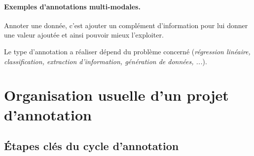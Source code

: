 			\paragraph{Exemples d'annotations multi-modales.}
		
		
		\begin{leftBarSummary}
			\begin{todolist}
				\item[\itemok] Annoter une donnée, c'est ajouter un complément d'information pour lui donner une valeur ajoutée et ainsi pouvoir mieux l'exploiter.
				\item[\itemok] Le type d'annotation a réaliser dépend du problème concerné (\textit{régression linéaire, classification, extraction d'information, génération de données, ...}).
			\end{todolist}
		\end{leftBarSummary}
	
	
    \section{Organisation usuelle d'un projet d'annotation}
	\label{section:2.2-ORGANISATION-ANNOTATION}
		
		
		\subsection{Étapes clés du cycle d'annotation}
		\label{section:2.2.1-ORGANISATION-ANNOTATION-ETAPES-CLES}
		
			
